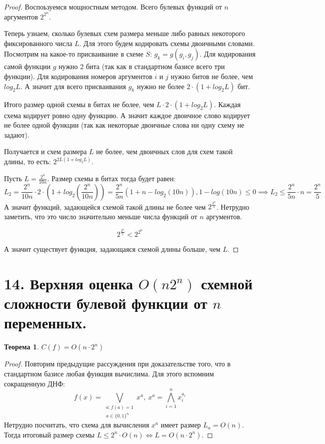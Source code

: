 \documentclass[a4paper, 12pt]{article}
\newtheorem*{theorem}{Теорема}
\begin{document}
\begin{proof}
    Воспоьзуемся мощностным методом. Всего булевых функций от $n$ аргументов $2^{2^n}$.

    Теперь узнаем, сколько булевых схем размера меньше либо равных некоторого фиксированного
    числа $L$. Для этого будем кодировать схемы двоичными словами. Посмотрим на 
    какое-то присваивание в схеме $S$: $g_k = g(g_i, g_j)$. Для кодирования
    самой функции $g$ нужно 2 бита (так как в стандартном базисе всего три функции).
    Для кодирования номеров аргументов $i$ и $j$ нужно битов не более, чем $log_2L$.
    А значит для всего присваивания $g_k$ нужно не более $2 \cdot (1 + log_2L)$ бит.

    Итого размер одной схемы в битах не более, чем $L \cdot 2 \cdot (1 + log_2L)$. Каждая схема
    кодирует ровно одну функцию. А значит каждое двоичное слово кодирует не более 
    одной функции (так как некоторые двоичные слова ни одну схему не задают).

    Получается и схем размера $L$ не более, чем двоичных слов для схем такой длины,
    то есть: $2^{2L(1 + log_2L)}$.

    Пусть $L = \frac{2^n}{10n}$. Размер схемы в битах тогда будет равен: 
    \[
    L_2 = \frac{2^n}{10n} \cdot 2 \cdot \left(1 + log_2\left( \frac{2^n}{10n} \right)\right) = 
    \frac{2^n}{5n} \left( 1 + n - log_2(10n) \right), 1 - log(10n) \leqslant 0 \implies
    L_2 \leqslant \frac{2^n}{5n}\cdot n = \frac{2^n}{5}
    \]
    А значит функций, задающейся схемой такой длины не более чем $2^{\frac{2^n}{5}}$.
    Нетрудно заметить, что это число значительно меньше числа функций от $n$ аргументов.
    
    \[
        2^{\frac{2^n}{5}} < 2^{2^n}
    \]

    А значит существует функция, задающаяся схемой длины больше, чем $L$.
    
\end{proof}

\section*{14. Верхняя оценка $O(n2^n)$ схемной сложности булевой функции от $n$ переменных.}

\begin{theorem}
    $C(f) = O(n \cdot 2^n)$
\end{theorem}

\begin{proof}
    Повторим предыдущие рассуждения при доказательстве того, что в стандартном
    базисе любая функция вычислима. Для этого вспомним сокращенную ДНФ:
    \[
    f(x) = \bigvee\limits_{\substack{a: f(a) = 1 \\ a \in \{0, 1\}^n}} x^a, \ 
    x^a = \bigwedge\limits_{i = 1}^{n} x_i^{a_i}
    \]
    Нетрудно посчитать, что схема для вычисления $x^a$ имеет размер $L_a = O(n)$.
    Тогда итоговый размер схемы $L \leqslant 2^n \cdot O(n) \iff L = O(n \cdot 2^n)$.
\end{proof}
\end{document}

